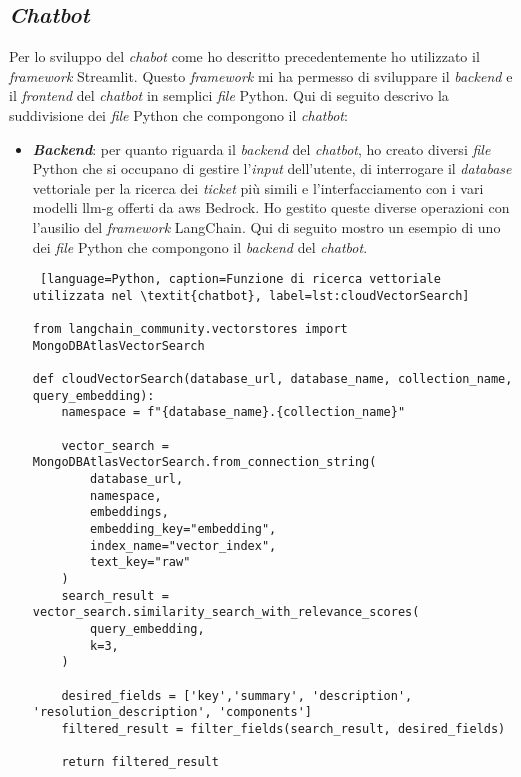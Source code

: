 \subsection{\textit{Chatbot}}
Per lo sviluppo del \textit{chabot} come ho descritto precedentemente ho utilizzato il \textit{framework} Streamlit. Questo \textit{framework} mi ha permesso di sviluppare il \textit{backend} e il \textit{frontend} del \textit{chatbot} in semplici \textit{file} Python.
Qui di seguito descrivo la suddivisione dei \textit{file} Python che compongono il \textit{chatbot}:
\begin{itemize}
    \item \textbf{\textit{Backend}}: per quanto riguarda il \textit{backend} del \textit{chatbot}, ho creato diversi \textit{file} Python che si occupano di gestire l'\textit{input} dell'utente, di interrogare il \textit{database} vettoriale per la ricerca dei \textit{ticket} più simili e l'interfacciamento con i vari modelli \gls{llm-g} offerti da \gls{aws} Bedrock. Ho gestito queste diverse operazioni con l'ausilio del \textit{framework} LangChain. Qui di seguito mostro un esempio di uno dei \textit{file} Python che compongono il \textit{backend} del \textit{chatbot}.
    \begin{lstlisting} [language=Python, caption=Funzione di ricerca vettoriale utilizzata nel \textit{chatbot}, label=lst:cloudVectorSearch]

from langchain_community.vectorstores import MongoDBAtlasVectorSearch

def cloudVectorSearch(database_url, database_name, collection_name, query_embedding):
    namespace = f"{database_name}.{collection_name}"

    vector_search = MongoDBAtlasVectorSearch.from_connection_string(
        database_url,
        namespace,
        embeddings,
        embedding_key="embedding",
        index_name="vector_index",
        text_key="raw"
    )
    search_result = vector_search.similarity_search_with_relevance_scores(
        query_embedding,
        k=3,
    )

    desired_fields = ['key','summary', 'description', 'resolution_description', 'components']
    filtered_result = filter_fields(search_result, desired_fields)

    return filtered_result
    \end{lstlisting}


\end{itemize}
